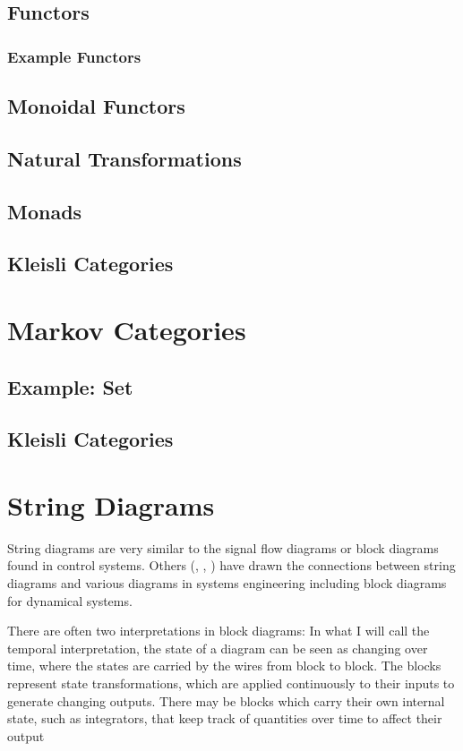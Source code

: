 \subsection{Functors}
\subsubsection{Example Functors}
\subsection{Monoidal Functors}
\subsection{Natural Transformations}
\subsection{Monads}
\subsection{Kleisli Categories}

\section{Markov Categories}

\newcommand{\id}{\mathrm{id}}
\newcommand{\comul}{\Delta}
\newcommand{\counit}{\delta}

\subsection{Example: Set}
\subsection{Kleisli Categories}

\section{String Diagrams}

String diagrams are very similar to the signal flow diagrams or block diagrams found in control systems.
Others (\cite{baez2015control}, \cite{fong2016thesis}, \cite{fong2016dynamicalsystems}) have drawn the connections between string diagrams and various diagrams in systems engineering including block diagrams for dynamical systems.

There are often two interpretations in block diagrams:
In what I will call the temporal interpretation, the state of a diagram can be seen as changing over time, where the states are carried by the wires from block to block. The blocks represent state transformations, which are applied continuously to their inputs to generate changing outputs.
There may be blocks which carry their own internal state, such as integrators, that keep track of quantities over time to affect their output

